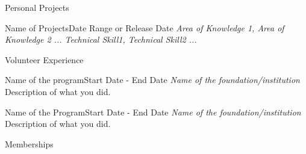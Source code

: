\documentclass[10pt, letterpaper]{article}
\begin{document}
    \begin{resumesection}{Personal Projects}
        \begin{resumesubsection}{Name of Projects}{Date Range or Release Date} 
            \textit{Area of Knowledge 1, Area of Knowledge 2 ... \hfill Technical Skill1, Technical Skill2 ...}
        \end{resumesubsection}
    \end{resumesection}    
    
    \begin{resumesection}{Volunteer Experience}
        \begin{resumesubsection}{Name of the program}{Start Date - End Date}
            \textit{Name of the foundation/institution}  \newline
            Description of what you did.        
        \end{resumesubsection} 
        \begin{resumesubsection}{Name of the Program}{Start Date - End Date}
            \textit{Name of the foundation/institution} \newline
            Description of what you did.    
        \end{resumesubsection} 
    \end{resumesection}

    \begin{resumesection}{Memberships}
    \end{resumesection}
    
\end{document}
